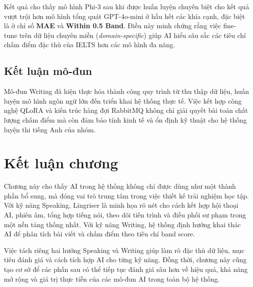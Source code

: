 Kết quả cho thấy mô hình Phi-3 sau khi được huấn luyện chuyên biệt cho kết quả vượt trội hơn mô hình tổng quát GPT-4o-mini ở hầu hết các khía cạnh, đặc biệt là ở chỉ số \textbf{MAE} và \textbf{Within 0.5 Band}. Điều này minh chứng rằng việc fine-tune trên dữ liệu chuyên miền (\textit{domain-specific}) giúp AI hiểu sâu sắc các tiêu chí chấm điểm đặc thù của IELTS hơn các mô hình đa năng.

\subsection{Kết luận mô-đun}
Mô-đun Writing đã hiện thực hóa thành công quy trình từ thu thập dữ liệu, huấn luyện mô hình ngôn ngữ lớn đến triển khai hệ thống thực tế. Việc kết hợp công nghệ QLoRA và kiến trúc hàng đợi RabbitMQ không chỉ giải quyết bài toán chất lượng chấm điểm mà còn đảm bảo tính kinh tế và ổn định kỹ thuật cho hệ thống luyện thi tiếng Anh của nhóm.

\section{Kết luận chương}
Chương này cho thấy AI trong hệ thống không chỉ được dùng như một thành phần bổ sung, mà đóng vai trò trung tâm trong việc thiết kế trải nghiệm học tập. Với kỹ năng Speaking, Lingriser là minh họa rõ nét cho cách kết hợp hội thoại AI, phiên âm, tổng hợp tiếng nói, theo dõi tiến trình và điều phối sư phạm trong một nền tảng thống nhất. Với kỹ năng Writing, hệ thống định hướng khai thác AI để phân tích bài viết và chấm điểm theo tiêu chí band score.

Việc tách riêng hai hướng Speaking và Writing giúp làm rõ đặc thù dữ liệu, mục tiêu đánh giá và cách tích hợp AI cho từng kỹ năng. Đồng thời, chương này cũng tạo cơ sở để các phần sau có thể tiếp tục đánh giá sâu hơn về hiệu quả, khả năng mở rộng và giá trị thực tiễn của các mô-đun AI trong toàn bộ hệ thống.